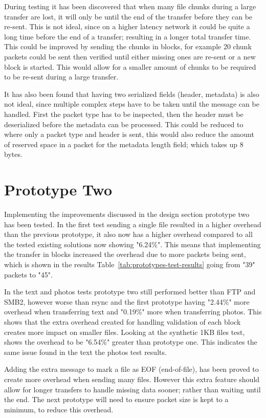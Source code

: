 During testing it has been discovered that when many file chunks during a large transfer are lost, it will only be until the end of the transfer before they can be re-sent. This is not ideal, since on a higher latency network it could be quite a long time before the end of a transfer; resulting in a longer total transfer time. This could be improved by sending the chunks in blocks, for example 20 chunk packets could be sent then verified until either missing ones are re-sent or a new block is started. This would allow for a smaller amount of chunks to be required to be re-sent during a large transfer.

It has also been found that having two serialized fields (header, metadata) is also not ideal, since multiple complex steps have to be taken until the message can be handled. First the packet type has to be inspected, then the header must be deserialized before the metadata can be processed. This could be reduced to where only a packet type and header is sent, this would also reduce the amount of reserved space in a packet for the metadata length field; which takes up 8 bytes.


\section{Prototype Two}
Implementing the improvements discussed in the design section prototype two has been tested. In the first test sending a single file resulted in a higher overhead than the previous prototype, it also now has a higher overhead compared to all the tested existing solutions now showing "6.24\%". This means that implementing the transfer in blocks increased the overhead due to more packets being sent, which is shown in the results Table~\ref{tab:prototypes-test-results} going from "39" packets to "45".

In the text and photos tests prototype two still performed better than FTP and SMB2, however worse than rsync and the first prototype having "2.44\%" more overhead when transferring text and "0.19\%" more when transferring photos. This shows that the extra overhead created for handling validation of each block creates more impact on smaller files. Looking at the synthetic 1KB files test, shows the overhead to be "6.54\%" greater than prototype one. This indicates the same issue found in the text the photos test results.

Adding the extra message to mark a file as EOF (end-of-file), has been proved to create more overhead when sending many files. However this extra feature should allow for longer transfers to handle missing data sooner; rather than waiting until the end. The next prototype will need to ensure packet size is kept to a minimum, to reduce this overhead.

